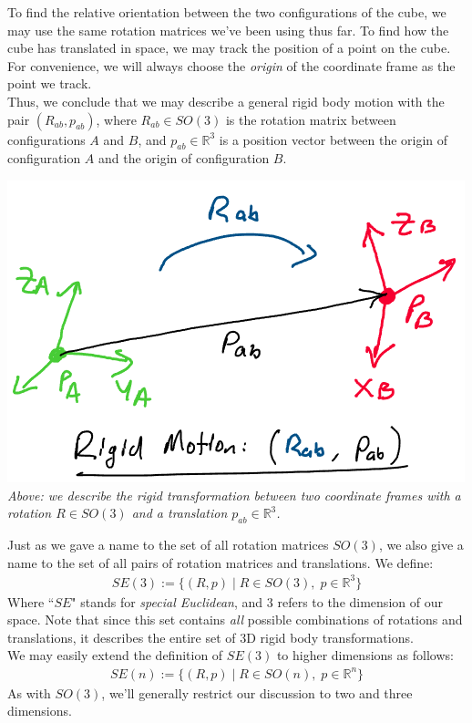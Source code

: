 \documentclass[oneside]{book}
\begin{document}
To find the relative orientation between the two configurations of the cube, we may use the same rotation matrices we've been using thus far. To find how the cube has translated in space, we may track the position of a point on the cube.\\
For convenience, we will always choose the \textit{origin} of the coordinate frame as the point we track.\\
Thus, we conclude that we may describe a general rigid body motion with the pair $(R_{ab}, p_{ab})$, where $R_{ab}\in SO(3)$ is the rotation matrix between configurations $A$ and $B$, and $p_{ab}\in \mathbb{R}^3$ is a position vector between the origin of configuration $A$ and the origin of configuration $B$.
\begin{center}
    \includegraphics[scale=0.5]{images/rotate_translate.png}\\
    \textit{Above: we describe the rigid transformation between two coordinate frames with a rotation $R\in SO(3)$ and a translation $p_{ab}\in \mathbb{R}^3$.}
\end{center}
Just as we gave a name to the set of all rotation matrices $SO(3)$, we also give a name to the set of all pairs of rotation matrices and translations. We define:
\begin{align}
    SE(3) := \{(R, p) \; | \; R\in SO(3), \; p\in \mathbb{R}^3\}
\end{align}
Where ``$SE$" stands for \textit{special Euclidean}, and $3$ refers to the dimension of our space. Note that since this set contains \textit{all} possible combinations of rotations and translations, it describes the entire set of 3D rigid body transformations.\\
We may easily extend the definition of $SE(3)$ to higher dimensions as follows:
\begin{align}
    SE(n) := \{(R, p) \; | \; R\in SO(n), \; p\in \mathbb{R}^n\}
\end{align}
As with $SO(3)$, we'll generally restrict our discussion to two and three dimensions.
\end{document}
